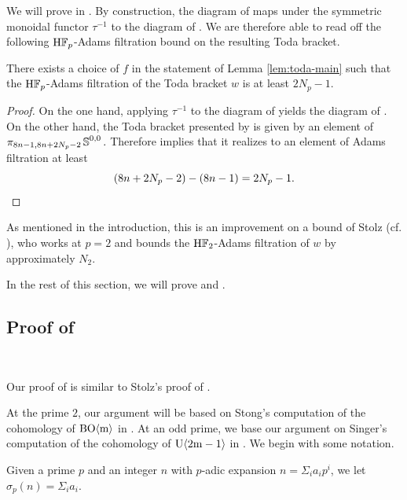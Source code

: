 We will prove  in . By construction, the diagram of  maps under the symmetric monoidal functor $\tau^{-1}$ to the diagram of . We are therefore able to read off the following $\mathrm{H}\mathbb{F}_p$-Adams filtration bound on the resulting Toda bracket.

\begin{thm} \label{thm:AdamsBound}
There exists a choice of $f$ in the statement of Lemma \ref{lem:toda-main} such that the $\mathrm{H}\mathbb{F}_p$-Adams filtration of the Toda bracket $w$ is at least $2N_p-1$.
\end{thm}

\begin{proof}
	On the one hand, applying $\tau^{-1}$ to the diagram of  yields the diagram of . On the other hand, the Toda bracket presented by  is given by an element of $\pi_{8n-1,8n+2N_p-2} \operatorname{\mathbb{S}}^{0,0}.$ Therefore  implies that it realizes to an element of Adams filtration at least \[\left(8n+2N_p-2\right)-(8n-1)=2N_p-1. \qedhere\]
\end{proof}

\begin{rmk}
    As mentioned in the introduction, this is an improvement on a bound of Stolz (cf. \cite[Satz 12.7]{StolzBook}), who works at $p=2$ and bounds the $\mathrm{H}\mathbb{F}_2$-Adams filtration of $w$ by approximately $N_2$.
\end{rmk}

In the rest of this section, we will prove  and .

\subsection{Proof of }
\label{subsec:filtration}\ 

Our proof of  is similar to Stolz's proof of \cite[Satz 12.7]{StolzBook}.

At the prime $2$, our argument will be based on Stong's computation of the cohomology of $\mathrm{BO}\mathrm{\langle m \rangle}$ in \cite{Stong}. At an odd prime, we base our argument on Singer's computation of the cohomology of $\mathrm{U} \mathrm{\langle 2m-1 \rangle}$ in \cite{Singer}. We begin with some notation.

\begin{ntn}
    Given a prime $p$ and an integer $n$ with $p$-adic expansion $n = \Sigma_i a_i p^i$, we let $\sigma_p (n) = \Sigma_i a_i$.
\end{ntn}

